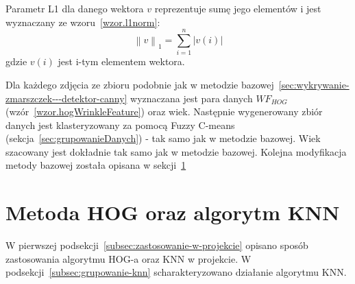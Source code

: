 \documentclass[a4paper,twoside,12pt]{book}
\begin{document}
    Parametr L1 dla danego wektora $v$ reprezentuje sumę jego elementów i jest wyznaczany ze wzoru~\ref{wzor.l1norm}:
    \large
    \begin{equation}
        \left \|v  \right \|_{1} = \sum_{i=1}^{n}\left |v(i)  \right |
        \label{wzor.l1norm}
    \end{equation}
    \normalsize
    gdzie $v(i)$ jest i-tym elementem wektora.

    Dla każdego zdjęcia ze zbioru podobnie jak w metodzie bazowej~\ref{sec:wykrywanie-zmarszczek---detektor-canny}
    wyznaczana jest para danych $WF_{HOG}$ (wzór~\ref{wzor.hogWrinkleFeature}) oraz wiek. Następnie wygenerowany
    zbiór danych jest klasteryzowany za pomocą Fuzzy C-means (sekcja~\ref{sec:grupowanieDanych}) - tak samo jak w
    metodzie
    bazowej.
    Wiek szacowany jest dokładnie tak samo jak w metodzie bazowej.
    Kolejna modyfikacja metody bazowej została opisana w sekcji~\ref{sec:metoda-hog-oraz-algorytm-knn}
    \section{Metoda HOG oraz algorytm KNN}\label{sec:metoda-hog-oraz-algorytm-knn}
    W pierwszej podsekcji~\ref{subsec:zastosowanie-w-projekcie} opisano sposób zastosowania algorytmu HOG-a oraz KNN
    w projekcie.
    W podsekcji~\ref{subsec:grupowanie-knn} scharakteryzowano działanie algorytmu KNN.
\end{document}
